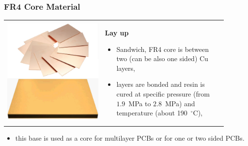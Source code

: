 \documentclass{beamer}
\begin{document}
	\begin{frame}
    \frametitle{FR4 Core Material}

		\begin{center}
			\begin{tabular}{m{0.4\linewidth} m{0.5\linewidth}}
			\includegraphics[scale=0.12]{obr02_jadro.png} & \textbf{Lay up}
			\begin{itemize}
				\item Sandwich, FR4 core is between two (can be also one sided) Cu layers,
				\item layers are bonded and resin is cured at specific pressure (from $1.9$~MPa to $2.8$~MPa) and temperature (about 190~$^\circ$C),
			\end{itemize}
			\end{tabular}
		\end{center}
		
		\begin{itemize}
			\item this base is used as a core for multilayer PCBs or for one or two sided PCBs.
		\end{itemize}
	\end{frame}
\end{document}
